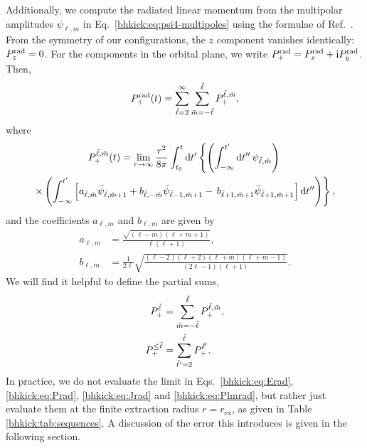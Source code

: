 Additionally, we compute the radiated linear momentum from the multipolar
amplitudes $\psi_{\ell, m}$ in Eq.~\eqref{bhkick:eq:psi4-multipoles} using the
formulae of Ref.~\cite{Ruiz:2007yx}. From the symmetry of our
configurations, the $z$ component vanishes identically: $P_z^{\mathrm{rad}}=0$.
For the components in the orbital plane, we write
$P_+^{\mathrm{rad}}=P_x^{\mathrm{rad}}+\mathrm{i}P_y^{\mathrm{rad}}$. Then,
\begin{equation}
     P_+^{\mathrm{rad}}(t) = \sum_{\tilde{\ell}=2}^{\infty}
     \sum_{\tilde{m}=-\tilde{\ell}}^{\tilde{\ell}}P_+^{\tilde{\ell},\tilde{m}},
     \label{bhkick:eq:P+rad}
\end{equation}
where
\begin{multline}
    P_+^{\tilde{\ell},\tilde{m}}(t) = \lim_{r\rightarrow \infty}
    \frac{r^2}{8\pi}\int_{t_0}^t\mathrm{d} t^{\prime}
    \left\{\left(\int^{t^\prime}_{-\infty}\mathrm{d} t^{\prime\prime}\,
    \psi_{\tilde{\ell},\tilde{m}}\right)\right. \\
    \left.\times\left(\int_{-\infty}^{t^\prime}
    \left[a_{\tilde{\ell},\tilde{m}}\bar{\psi}_{\tilde{\ell},\tilde{m}+1}+
    b_{\tilde{\ell},-\tilde{m}}\bar{\psi}_{\tilde{\ell}-1,\tilde{m}+1}
    -\,b_{\tilde{\ell}+1,\tilde{m}+1}\bar{\psi}_{\tilde{\ell}+1,\tilde{m}+1}\right]
    \mathrm{d} t^{\prime\prime}\right)\right\},
    \label{bhkick:eq:Plmrad}
\end{multline}
and the coefficients $a_{\ell,m}$ and $b_{\ell,m}$ are given by
%
\begin{align}
    a_{\ell, m} &= \frac{\sqrt{\left(\ell - m\right)\left(\ell +
    m+1\right)}}{\ell\left(\ell + 1\right)},\\
    b_{\ell, m} &= \frac{1}{2\ell}\sqrt{\frac{\left(\ell - 2\right)
    \left(\ell + 2\right) \left(\ell + m\right) \left(\ell + m -
    1\right)}{\left(2\ell - 1\right)\left(\ell + 1\right)}}.
\end{align}
%
We will find it helpful to define the partial sums,
%
\begin{align}
    P_+^{\tilde{\ell}} &= \sum_{\tilde{m} = -\tilde{\ell}}^{\tilde{\ell}} P_+^{\tilde{\ell},\tilde{m}},\\
    P_+^{\leq\tilde{\ell}} &= \sum_{\tilde{\ell}^\prime=2}^{\tilde{\ell}} P_+^{\tilde{\ell}^\prime}.
    \label{bhkick:eq:partialkick}
\end{align}
%
In practice, we do not evaluate the limit in Eqs.~\eqref{bhkick:eq:Erad},
\eqref{bhkick:eq:Prad}, \eqref{bhkick:eq:Jrad} and \eqref{bhkick:eq:Plmrad}, but rather just
evaluate them at the finite extraction radius $r=r_{\mathrm{ex}}$, as given
in Table \ref{bhkick:tab:sequences}. A discussion of the error this introduces is
given in the following section.

